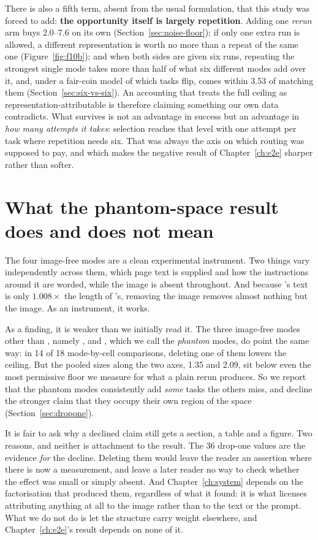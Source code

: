 There is also a fifth term, absent from the usual formulation, that this study
was forced to add: \textbf{the opportunity itself is largely repetition}. Adding
one \emph{rerun} arm buys 2.0--7.6\pp{} on its own
(Section~\ref{sec:noise-floor}); if only one extra run is allowed, a different
representation is worth no more than a repeat of the same one
(Figure~\ref{fig:f10b}); and when both sides are given six runs, repeating the
strongest single mode takes more than half of what six different modes add over
it, and, under a fair-coin model of which tasks flip, comes within
3.53\pp{} of matching them (Section~\ref{sec:six-vs-six}). An accounting that treats
the full ceiling as representation-attributable is therefore claiming something
our own data contradicts. What survives is not an advantage in success but an
advantage in \emph{how many attempts it takes}: selection reaches that level
with one attempt per task where repetition needs six. That was always the axis
on which routing was supposed to pay, and which makes the negative result
of Chapter~\ref{ch:e2e} sharper rather than softer.

\section{What the phantom-space result does and does not mean}
\label{sec:phantom-meaning}

The four image-free modes are a clean experimental instrument. Two things vary
independently across them, which page text is supplied and how the
instructions around it are worded, while the image is absent throughout.
And because \mSoM{}'s text is only $1.008\times$ the length of \mDOM{}'s,
removing the image removes almost nothing but the image. As an instrument, it
works.

As a finding, it is weaker than we initially read it. The three image-free
modes other than \mDOM{}, namely \mPT{}, \mPP{} and \mPS{}, which we call the
\emph{phantom} modes, do point the same way: in 14 of 18 mode-by-cell
comparisons, deleting one of them lowers the ceiling. But the pooled sizes
along the two axes, 1.35 and 2.09\pp, sit below even the most permissive floor
we measure for what a plain rerun produces. So we report that the phantom
modes consistently add \emph{some} tasks the others miss, and decline the
stronger claim that they occupy their own region of the space
(Section~\ref{sec:dropone}).

It is fair to ask why a declined claim still gets a section, a table and a
figure. Two reasons, and neither is attachment to the result. The 36 drop-one
values are the evidence \emph{for} the decline. Deleting them would leave the
reader an assertion where there is now a measurement, and leave a later reader
no way to check whether the effect was small or simply absent. And Chapter~\ref{ch:system} depends on the factorisation that produced them, regardless of what it found: it is what licenses
attributing anything at all to the image rather than to the text or the prompt.
What we do not do is let the structure carry weight elsewhere, and
Chapter~\ref{ch:e2e}'s result depends on none of it.

